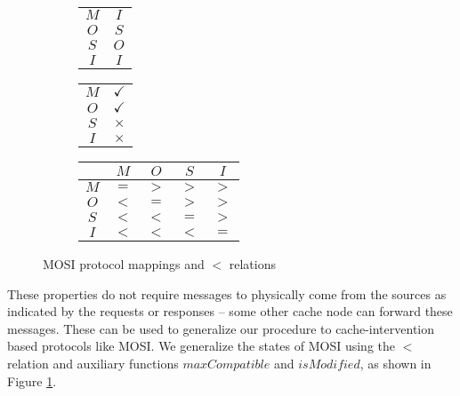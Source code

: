 \begin{figure}
\begin{subfigure}{.25\linewidth}
\centering
\begin{tabular}{|c|c|}
\hline
$M$ & $I$\\
$O$ & $S$\\
$S$ & $O$\\
$I$ & $I$\\
\hline
\end{tabular}
\end{subfigure}
\begin{subfigure}{.25\linewidth}
\centering
\begin{tabular}{|c|c|}
\hline
$M$ & $\checkmark$\\
$O$ & $\checkmark$\\
$S$ & $\times$\\
$I$ & $\times$\\
\hline
\end{tabular}
\end{subfigure}
\begin{subfigure}{.48\linewidth}
\centering
\begin{tabular}{|c|cccc|}
\hline
& $M$ & $O$ & $S$ & $I$\\
\hline
$M$ & $=$ & $>$ & $>$ & $>$\\
$O$ & $<$ & $=$ & $>$ & $>$\\
$S$ & $<$ & $<$ & $=$ & $>$\\
$I$ & $<$ & $<$ & $<$ & $=$\\
\hline
\end{tabular}
\end{subfigure}
\caption{MOSI protocol mappings and $<$ relations}
\label{mosi}
\end{figure}

These properties do not require messages to physically come from the sources as
indicated by the requests or responses -- some other cache node can forward
these messages. These can be used to generalize our procedure to
cache-intervention based protocols like MOSI. We generalize the states of MOSI
using the $<$ relation and auxiliary functions $maxCompatible$ and $isModified$,
as shown in Figure \ref{mosi}. 


